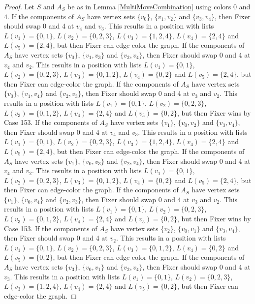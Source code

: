 \documentclass[12pt]{amsart}
\theoremstyle{plain}
\theoremstyle{definition}
\theoremstyle{remark}
\begin{document}
\begin{proof}
Let $S$ and $A_S$ be as in Lemma \ref{MultiMoveCombination} using colors $0$ and $4$. If the components of $A_S$ have vertex sets $\{v_0\}$, $\{v_1, v_2\}$ and $\{v_3, v_4\}$, then Fixer should swap 0 and 4 at $v_4$ and $v_3$. This results in a position with lists $L(v_1) = \{0, 1\}$, $L(v_2) = \{0, 2, 3\}$, $L(v_3) = \{1, 2, 4\}$, $L(v_4) = \{2, 4\}$ and $L(v_5) = \{2, 4\}$, but then Fixer can edge-color the graph.
If the components of $A_S$ have vertex sets $\{v_0\}$, $\{v_1, v_3\}$ and $\{v_2, v_4\}$, then Fixer should swap 0 and 4 at $v_4$ and $v_2$. This results in a position with lists $L(v_1) = \{0, 1\}$, $L(v_2) = \{0, 2, 3\}$, $L(v_3) = \{0, 1, 2\}$, $L(v_4) = \{0, 2\}$ and $L(v_5) = \{2, 4\}$, but then Fixer can edge-color the graph.
If the components of $A_S$ have vertex sets $\{v_0\}$, $\{v_1, v_4\}$ and $\{v_2, v_3\}$, then Fixer should swap 0 and 4 at $v_3$ and $v_2$. This results in a position with lists $L(v_1) = \{0, 1\}$, $L(v_2) = \{0, 2, 3\}$, $L(v_3) = \{0, 1, 2\}$, $L(v_4) = \{2, 4\}$ and $L(v_5) = \{0, 2\}$, but then Fixer wins by Case 153.
If the components of $A_S$ have vertex sets $\{v_1\}$, $\{v_0, v_2\}$ and $\{v_3, v_4\}$, then Fixer should swap 0 and 4 at $v_4$ and $v_3$. This results in a position with lists $L(v_1) = \{0, 1\}$, $L(v_2) = \{0, 2, 3\}$, $L(v_3) = \{1, 2, 4\}$, $L(v_4) = \{2, 4\}$ and $L(v_5) = \{2, 4\}$, but then Fixer can edge-color the graph.
If the components of $A_S$ have vertex sets $\{v_1\}$, $\{v_0, v_3\}$ and $\{v_2, v_4\}$, then Fixer should swap 0 and 4 at $v_4$ and $v_2$. This results in a position with lists $L(v_1) = \{0, 1\}$, $L(v_2) = \{0, 2, 3\}$, $L(v_3) = \{0, 1, 2\}$, $L(v_4) = \{0, 2\}$ and $L(v_5) = \{2, 4\}$, but then Fixer can edge-color the graph.
If the components of $A_S$ have vertex sets $\{v_1\}$, $\{v_0, v_4\}$ and $\{v_2, v_3\}$, then Fixer should swap 0 and 4 at $v_3$ and $v_2$. This results in a position with lists $L(v_1) = \{0, 1\}$, $L(v_2) = \{0, 2, 3\}$, $L(v_3) = \{0, 1, 2\}$, $L(v_4) = \{2, 4\}$ and $L(v_5) = \{0, 2\}$, but then Fixer wins by Case 153.
If the components of $A_S$ have vertex sets $\{v_2\}$, $\{v_0, v_1\}$ and $\{v_3, v_4\}$, then Fixer should swap 0 and 4 at $v_2$. This results in a position with lists $L(v_1) = \{0, 1\}$, $L(v_2) = \{0, 2, 3\}$, $L(v_3) = \{0, 1, 2\}$, $L(v_4) = \{0, 2\}$ and $L(v_5) = \{0, 2\}$, but then Fixer can edge-color the graph.
If the components of $A_S$ have vertex sets $\{v_3\}$, $\{v_0, v_1\}$ and $\{v_2, v_4\}$, then Fixer should swap 0 and 4 at $v_3$. This results in a position with lists $L(v_1) = \{0, 1\}$, $L(v_2) = \{0, 2, 3\}$, $L(v_3) = \{1, 2, 4\}$, $L(v_4) = \{2, 4\}$ and $L(v_5) = \{0, 2\}$, but then Fixer can edge-color the graph.

\end{proof}
\end{document}
